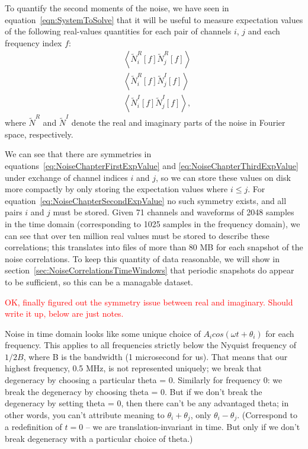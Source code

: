 To quantify the second moments of the noise, we have seen in equation~\ref{eqn:SystemToSolve} that it will be useful to measure expectation values of the following real-values quantities for each pair of channels $i$, $j$ and each frequency index $f$:
\begin{subequations}\begin{align}
&\left<\widetilde{N}^R_i[f]\widetilde{N}^R_j[f]\right>\label{eq:NoiseChapterFirstExpValue}\\
&\left<\widetilde{N}^R_i[f]\widetilde{N}^I_j[f]\right>\label{eq:NoiseChapterSecondExpValue}\\
&\left<\widetilde{N}^I_i[f]\widetilde{N}^I_j[f]\right>\label{eq:NoiseChapterThirdExpValue},
\end{align}\end{subequations}
where $\widetilde{N}^R$ and $\widetilde{N}^I$ denote the real and imaginary parts of the noise in Fourier space, respectively.

We can see that there are symmetries in equations~\ref{eq:NoiseChapterFirstExpValue} and \ref{eq:NoiseChapterThirdExpValue} under exchange of channel indices $i$ and $j$, so we can store these values on disk more compactly by only storing the expectation values where $i \leq j$.  For equation~\ref{eq:NoiseChapterSecondExpValue} no such symmetry exists, and all pairs $i$ and $j$ must be stored.  Given 71 channels and waveforms of 2048 samples in the time domain (corresponding to 1025 samples in the frequency domain), we can see that over ten million real values must be stored to describe these correlations; this translates into files of more than 80 MB for each snapshot of the noise correlations.  To keep this quantity of data reasonable, we will show in section~\ref{sec:NoiseCorrelationsTimeWindows} that periodic snapshots do appear to be sufficient, so this can be a managable dataset.

\textcolor{red}{OK, finally figured out the symmetry issue between real and imaginary.  Should write it up, below are just notes.}

Noise in time domain looks like some unique choice of $A_i cos(\omega t + \theta_i)$ for each frequency.  This applies to all frequencies strictly below the Nyquist frequency of $1/2B$, where B is the bandwidth (1 microsecond for us).  That means that our highest frequency, 0.5 MHz, is not represented uniquely; we break that degeneracy by choosing a particular theta = 0.  Similarly for frequency 0: we break the degeneracy by choosing theta = 0.  But if we don't break the degeneracy by setting theta = 0, then there can't be any advantaged theta; in other words, you can't attribute meaning to $\theta_i + \theta_j$, only $\theta_i - \theta_j$.  (Correspond to a redefinition of $t=0$ -- we are translation-invariant in time.  But only if we don't break degeneracy with a particular choice of theta.)

